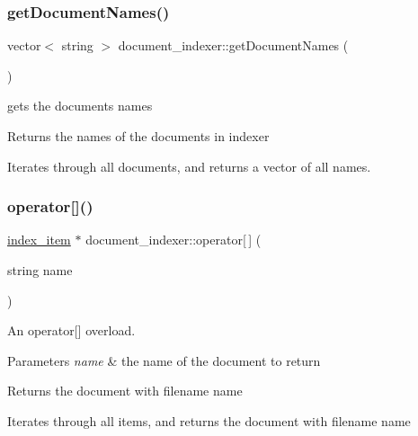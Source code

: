 \subsubsection{\texorpdfstring{get\+Document\+Names()}{getDocumentNames()}}
{\footnotesize\ttfamily vector$<$ string $>$ document\+\_\+indexer\+::get\+Document\+Names (\begin{DoxyParamCaption}{ }\end{DoxyParamCaption})}



gets the documents names 

\begin{DoxyReturn}{Returns}
the names of the documents in indexer
\end{DoxyReturn}
Iterates through all documents, and returns a vector of all names. \mbox{\label{classdocument__indexer_a2f17781feae3360c3900190b69709f0d}} 
\subsubsection{\texorpdfstring{operator[]()}{operator[]()}\hspace{0.1cm}{\footnotesize\ttfamily [1/2]}}
{\footnotesize\ttfamily \hyperlink{classindex__item}{index\+\_\+item} $\ast$ document\+\_\+indexer\+::operator\mbox{[}$\,$\mbox{]} (\begin{DoxyParamCaption}\item[{string}]{name }\end{DoxyParamCaption})}



An operator\mbox{[}\mbox{]} overload. 


\begin{DoxyParams}{Parameters}
{\em name} & the name of the document to return \\
\hline
\end{DoxyParams}
\begin{DoxyReturn}{Returns}
the document with filename name
\end{DoxyReturn}
Iterates through all items, and returns the document with filename name \mbox{\label{classdocument__indexer_ab6573986790793c03f05192a526d217d}} 
